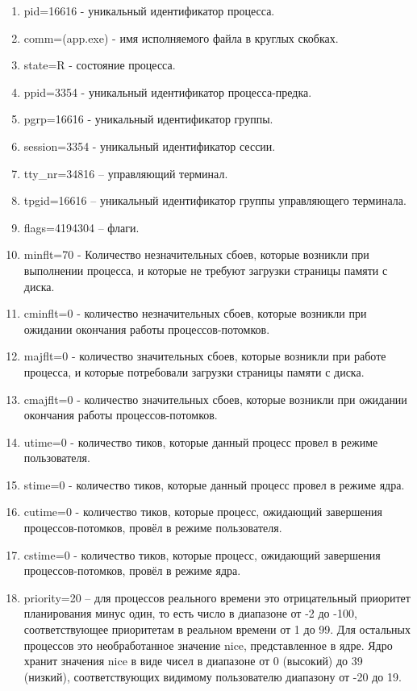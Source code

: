 \documentclass[a4paper,12pt]{article}
\begin{document}
	\begin{enumerate}
		\item pid=16616 - уникальный идентификатор процесса.
		\item comm=(app.exe) - имя исполняемого файла в круглых скобках.
		\item state=R - состояние процесса.
		\item ppid=3354 - уникальный идентификатор процесса-предка.
		\item pgrp=16616 - уникальный идентификатор группы.
		\item session=3354 - уникальный идентификатор сессии.
		\item tty\_nr=34816 – управляющий терминал.
		\item tpgid=16616 – уникальный идентификатор группы управляющего терминала.
		\item flags=4194304 – флаги.
		\item minflt=70 - Количество незначительных сбоев, которые возникли при выполнении процесса, и которые не требуют загрузки страницы памяти с диска.
		\item cminflt=0 - количество незначительных сбоев, которые возникли при ожидании окончания работы процессов-потомков.
		\item majflt=0 - количество значительных сбоев, которые возникли при работе процесса, и которые потребовали загрузки страницы памяти с диска.
		\item cmajflt=0 - количество значительных сбоев, которые возникли при ожидании окончания работы процессов-потомков.
		\item utime=0 - количество тиков, которые данный процесс провел в режиме пользователя.
		\item stime=0 - количество тиков, которые данный процесс провел в режиме ядра.
		\item cutime=0 - количество тиков, которые процесс, ожидающий завершения процессов-потомков, провёл в режиме пользователя.
		\item cstime=0 - количество тиков, которые процесс, ожидающий завершения процессов-потомков, провёл в режиме ядра.
		\item priority=20 – для процессов реального времени это отрицательный приоритет планирования минус один, то есть число в диапазоне от -2 до -100, соответствующее приоритетам в реальном времени от 1 до 99. Для остальных процессов это необработанное значение nice, представленное в ядре. Ядро хранит значения nice в виде чисел в диапазоне от 0 (высокий) до 39 (низкий), соответствующих видимому пользователю диапазону от -20 до 19.

\end{enumerate}
\end{document}
